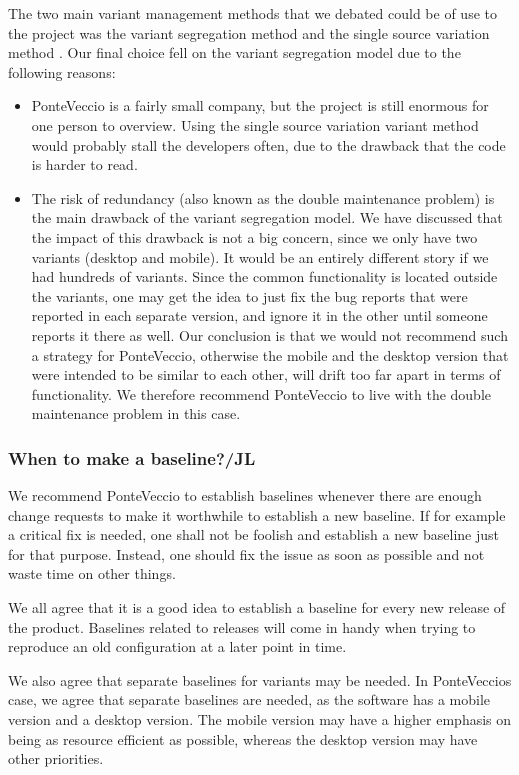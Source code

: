 \documentclass[10pt]{article}
\begin{document}
\noindent The two main variant management methods that we debated could be of use to the project was the variant segregation method and the single source variation method \cite{Mahler}. Our final choice fell on the variant segregation model due to the following reasons:
\begin{itemize}
\item PonteVeccio is a fairly small company, but the project is still enormous for one person to overview. Using the single source variation variant method would probably stall the developers often, due to the drawback that the code is harder to read.
\item The risk of redundancy (also known as the double maintenance problem\cite{Babich}) is the main drawback of the variant segregation model. We have discussed that the impact of this drawback is not a big concern, since we only have two variants (desktop and mobile). It would be an entirely different story if we had hundreds of variants. Since the common functionality is located outside the variants, one may get the idea to just fix the bug reports that were reported in each separate version, and ignore it in the other until someone reports it there as well. Our conclusion is that we would not recommend such a strategy for PonteVeccio, otherwise the mobile and the desktop version that were intended to be similar to each other, will drift too far apart in terms of functionality. We therefore recommend PonteVeccio to live with the double maintenance problem in this case.

\end{itemize}
\noindent
\subsubsection{When to make a baseline?/JL}
We recommend PonteVeccio to establish baselines whenever there are enough change requests to make it worthwhile to establish a new baseline. If for example a critical fix is needed, one shall not be foolish and establish a new baseline just for that purpose. Instead, one should fix the issue as soon as possible and not waste time on other things.

\noindent We all agree that it is a good idea to establish a baseline for every new release of the product. Baselines related to releases will come in handy when trying to reproduce an old configuration at a later point in time.

\noindent We also agree that separate baselines for variants may be needed. In PonteVeccios case, we agree that separate baselines are needed, as the software has a mobile version and a desktop version. The mobile version may have a higher emphasis on being as resource efficient as possible, whereas the desktop version may have other priorities.
\end{document}
